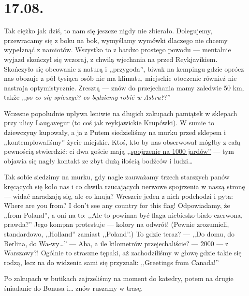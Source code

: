 \chapter*{17.08.}

Tak ciężko jak dziś, to nam się jeszcze nigdy nie zbierało. Dolegujemy, przewracamy się z boku na bok, wymyślamy wymówki dlaczego nie chcemy wypełznąć z namiotów. Wszystko to z bardzo prostego powodu --- mentalnie wyjazd skończył się wczoraj, z chwilą wjechania na  przed Reykjavikiem. Skończyło się obcowanie z naturą i ,,przygoda'', biwak na kempingu gdzie oprócz nas obozuje z pół tysiąca osób nie ma klimatu, miejsckie otoczenie również nie nastraja optymistycznie. Zresztą --- znów do przejechania mamy zaledwie 50 km, także \emph{,,po co się spieszyć? co będziemy robić w Asbru?!''}

Wczesne popołudnie upływa leniwie na długich zakupach pamiątek w sklepach przy ulicy Laugavegur (to coś jak reykjawickie Krupówki). W sumie to dziewczyny kupowały, a ja z Putem siedzieliśmy na murku przed sklepem i ,,kontemplowaliśmy'' życie miejskie. Ktoś, kto by nas obserwował mógłby z całą pewnością stwierdzić: ci dwa goście mają \href{http://en.wikipedia.org/wiki/Thousand-yard_stare}{,,spojrzenie na 1000 jardów''} --- tym objawia się nagły kontakt ze zbyt dużą ilością bodźców i ludzi…


Tak sobie siedzimy na murku, gdy nagle zauważamy trzech starszych panów kręcących się koło nas i co chwila rzucających nerwowe spojrzenia w naszą stronę --- widać naradzają się, ale co knują? Wreszcie jeden z nich podchodzi i pyta: Where are you from? I don’t see any country for this flag! Odpowiadamy, że ,,from Poland'', a oni na to: ,,Ale to powinna być flaga niebiesko-biało-czerwona, prawda?'' Jego kompan protestuje --- kolory na odwrót! (Pewnie zrozumieli, standardowo, ,,Holland'' zamiast ,,Poland''.) To gdzie teraz? --- ,,Do domu, do Berlina, do Wa-wy…'' --- Aha, a ile kilometrów przejechaliście? --- 2000 --- z Warszawy?! Ogólnie to straszne tępaki, aż zachodziliśmy w głowę gdzie takie się rodzą, lecz na do widzenia sami się przyznali: ,,Greetings from Canada!''

Po zakupach w butikach zajrzeliśmy na moment do katedry, potem na drugie śniadanie do Bonusa i… znów ruszamy w trasę.


